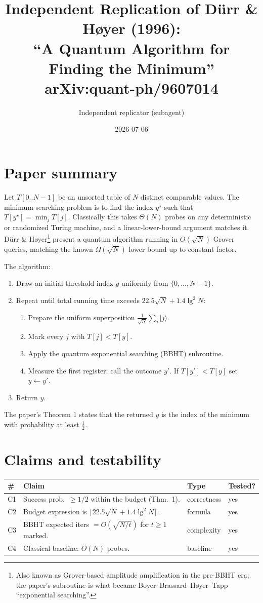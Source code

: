\documentclass[11pt]{article}
\title{Independent Replication of D\"urr \& H\o yer (1996):\\
       ``A Quantum Algorithm for Finding the Minimum''\\
       \normalsize{arXiv:quant-ph/9607014}}
\author{Independent replicator (subagent)}
\date{2026-07-06}
\begin{document}
\maketitle

\section{Paper summary}

Let $T[0..N-1]$ be an unsorted table of $N$ distinct comparable values. The
minimum-searching problem is to find the index $y^\star$ such that $T[y^\star]
= \min_j T[j]$. Classically this takes $\Theta(N)$ probes on any deterministic
or randomized Turing machine, and a linear-lower-bound argument matches it.
D\"urr \& H\o yer\footnote{Also known as Grover-based amplitude amplification
in the pre-BBHT era; the paper's subroutine is what became Boyer--Brassard--H\o yer--Tapp
``exponential searching''.} present a quantum algorithm running in
$O(\sqrt{N})$ Grover queries, matching the known $\Omega(\sqrt{N})$ lower bound
up to constant factor.

The algorithm:
\begin{enumerate}
    \item Draw an initial threshold index $y$ uniformly from $\{0,\dots,N-1\}$.
    \item Repeat until total running time exceeds $22.5\sqrt{N} + 1.4\lg^2 N$:
    \begin{enumerate}
        \item Prepare the uniform superposition $\frac{1}{\sqrt{N}}\sum_j |j\rangle$.
        \item Mark every $j$ with $T[j] < T[y]$.
        \item Apply the quantum exponential searching (BBHT) subroutine.
        \item Measure the first register; call the outcome $y'$. If $T[y'] < T[y]$
              set $y \gets y'$.
    \end{enumerate}
    \item Return $y$.
\end{enumerate}

The paper's Theorem 1 states that the returned $y$ is the index of the minimum
with probability at least $\tfrac{1}{2}$.

\section{Claims and testability}

\begin{tabular}{@{}llll@{}}
\toprule
\# & Claim & Type & Tested? \\
\midrule
C1 & Success prob.\ $\geq 1/2$ within the budget (Thm.\ 1). & correctness & yes \\
C2 & Budget expression is $\lceil 22.5\sqrt{N} + 1.4\lg^2 N\rceil$. & formula  & yes \\
C3 & BBHT expected iters $= O(\sqrt{N/t})$ for $t \geq 1$ marked. & complexity & yes \\
C4 & Classical baseline: $\Theta(N)$ probes. & baseline & yes \\
\bottomrule
\end{tabular}
\end{document}
